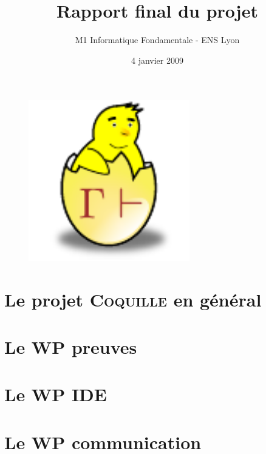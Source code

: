 \documentclass[a4paper,10pt]{article}
\date{4 janvier 2009}
\title{Rapport final du projet \coquille{}}
\author{M1 Informatique Fondamentale - ENS Lyon}
\newcommand{\coquille}{\textsc{Coquille}}
\begin{document}
\begin{figure}
\begin{center}
 \includegraphics[width=7cm]{poussin.pdf}
\end{center}
\end{figure}
\maketitle
\newpage

\tableofcontents
\newpage

\part{Le projet \coquille{} en g\'en\'eral}



\part{Le WP preuves}



\part{Le WP IDE}


% 

\part{Le WP communication}



\newpage


\end{document}
